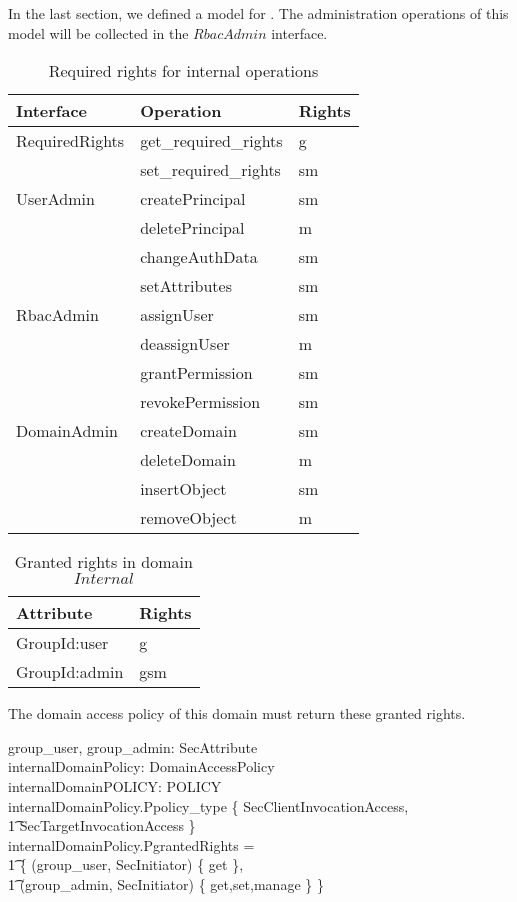 In the last section, we defined a \rbaci{} model for \corbasec.  The
administration operations of this model will be collected in the $RbacAdmin$
interface. 
\begin{table}[ht]
  \begin{center}
    \begin{tabular}{l|l|l}
      Interface & Operation & Rights \\ \hline
      RequiredRights & get\_required\_rights & g \\
      & set\_required\_rights & sm \\ \hline
      UserAdmin & createPrincipal & sm \\
      & deletePrincipal & m \\
      & changeAuthData & sm \\
      & setAttributes & sm \\ \hline
      RbacAdmin & assignUser & sm \\
      & deassignUser & m \\
      & grantPermission & sm \\
      & revokePermission & sm \\ \hline
      DomainAdmin & createDomain & sm \\
      & deleteDomain & m \\
      & insertObject & sm \\
      & removeObject & m \\
    \end{tabular}
    \caption{Required rights for internal operations}
  \end{center}
\end{table}
\begin{table}[ht]
  \begin{center}
    \begin{tabular}{l|l}
      Attribute & Rights \\ \hline
      GroupId:user & g \\ \hline
      GroupId:admin & gsm \\
    \end{tabular}
    \caption{Granted rights in domain $Internal$}
  \end{center}
\end{table}
The domain access policy of this domain must return these granted rights.
\begin{axdef}
  group\_user, group\_admin: SecAttribute \\
  internalDomainPolicy: DomainAccessPolicy \\
  internalDomainPOLICY: POLICY \\
  \where
  internalDomainPolicy.Ppolicy\_type \in \{ SecClientInvocationAccess, \\
  \t1 SecTargetInvocationAccess \} \\
  internalDomainPolicy.PgrantedRights = \\
  \t1 \{ (group\_user, SecInitiator) \mapsto \{ get \}, \\
  \t1 (group\_admin, SecInitiator) \mapsto \{ get,set,manage \} \} \\
\end{axdef}
